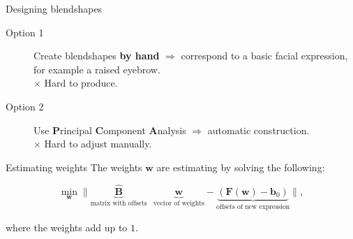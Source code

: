 \documentclass{beamer}
\newcommand{\w}{\mathbf{w}}
\newcommand{\F}{\mathbf{F}}
\newcommand{\bb}{\mathbf{b}}
\begin{document}
\begin{frame}{Designing blendshapes}
\begin{description}
	\item[Option 1] Create blendshapes \textbf{by hand} $\Rightarrow$ correspond to a basic facial expression, for example a raised eyebrow.\\
					$\times$  Hard to produce. \vspace{0.5 cm}
	\item[Option 2] Use \textbf{P}rincipal \textbf{C}omponent \textbf{A}nalysis $\Rightarrow$ automatic construction. \\
					$\times$  Hard to adjust manually.
\end{description}

\end{frame}


\begin{frame}{Estimating weights}
The weights $\w$ are estimating by solving the following:


\begin{minipage}[t]{0.95\linewidth} 
\begin{tcolorbox}[colback=gray!5,colframe=jvagreen, title=Minimisation problem]
\begin{equation*}
	\min_\w \| \underbrace{\hat{\mathbf{B}}}_{\text{matrix with offsets}} \: \: \: \underbrace{\w}_{\text{vector of weights}} - \underbrace{(\F(\w) - \bb_0)}_{\text{offsets of new expression}} \|,
\end{equation*}        
\end{tcolorbox} 
\end{minipage}  \vspace{0.5 cm}

where the weights add up to $1$.

\end{frame}
\end{document}
